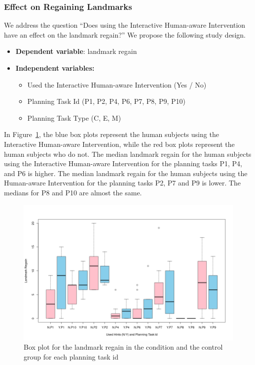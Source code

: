 \subsubsection{Effect on Regaining Landmarks}
We address the question ``Does using the Interactive Human-aware Intervention have an effect on the landmark regain?''
We propose the following study design.
\begin{itemize}
\item \textbf{Dependent variable}: landmark regain
\item \textbf{Independent variables:}
\begin{itemize}
\item Used the Interactive Human-aware Intervention (Yes / No)
\item Planning Task Id (P1, P2, P4, P6, P7, P8, P9, P10)
\item Planning Task Type (C, E, M)
\end{itemize}
\end{itemize}

In Figure~\ref{fig:regainbypid}, the blue box plots represent the human subjects using the Interactive Human-aware Intervention, while the red box plots represent the human subjects who do not.
The median landmark regain for the human subjects using the Interactive Human-aware Intervention for the planning tasks P1, P4, and P6 is higher.
The median landmark regain for the human subjects using the Human-aware Intervention for the planning tasks P2, P7 and P9 is lower.
The medians for P8 and P10 are almost the same.

\begin{figure}[tpb]
  \centering
\includegraphics[width=0.9\columnwidth]{img/regainbypid.png}
  \caption{Box plot for the landmark regain in the condition and the control group for each planning task id}
  \label{fig:regainbypid}
\end{figure}


